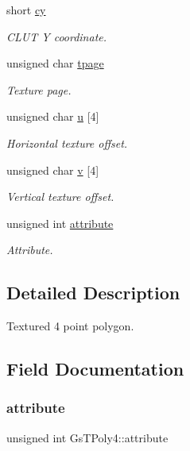 \begin{DoxyCompactItemize}
short \hyperlink{structGsTPoly4_adb8d1f6369413b8c9d5393b36da40da8}{cy}
\begin{DoxyCompactList}\small\item\em C\+L\+UT Y coordinate. \end{DoxyCompactList}\item 
unsigned char \hyperlink{structGsTPoly4_a1a79cc052f1e999badbd984ea7860b54}{tpage}
\begin{DoxyCompactList}\small\item\em Texture page. \end{DoxyCompactList}\item 
unsigned char \hyperlink{structGsTPoly4_a92294b5e2be9cab5b87149fa8840ce77}{u} \mbox{[}4\mbox{]}
\begin{DoxyCompactList}\small\item\em Horizontal texture offset. \end{DoxyCompactList}\item 
unsigned char \hyperlink{structGsTPoly4_a76767d49028942c4e3d7aa0d54b60ee7}{v} \mbox{[}4\mbox{]}
\begin{DoxyCompactList}\small\item\em Vertical texture offset. \end{DoxyCompactList}\item 
unsigned int \hyperlink{structGsTPoly4_a4faedd0c8baf74d035520dd8c7b6ace6}{attribute}
\begin{DoxyCompactList}\small\item\em Attribute. \end{DoxyCompactList}\end{DoxyCompactItemize}


\subsection{Detailed Description}
Textured 4 point polygon. 

\subsection{Field Documentation}
\mbox{\label{structGsTPoly4_a4faedd0c8baf74d035520dd8c7b6ace6}} 
\subsubsection{\texorpdfstring{attribute}{attribute}}
{\footnotesize\ttfamily unsigned int Gs\+T\+Poly4\+::attribute}



